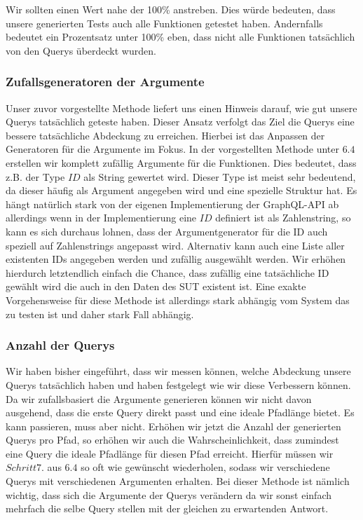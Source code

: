 Wir sollten einen Wert nahe der 100\% anstreben.
Dies würde bedeuten, dass unsere generierten Tests auch alle Funktionen getestet haben.
Andernfalls bedeutet ein Prozentsatz unter 100\% eben, dass nicht alle Funktionen tatsächlich von den Querys überdeckt wurden.


\subsubsection{Zufallsgeneratoren der Argumente}

Unser zuvor vorgestellte Methode liefert uns einen Hinweis darauf, wie gut unsere Querys tatsächlich geteste haben.
Dieser Ansatz verfolgt das Ziel die Querys eine bessere tatsächliche Abdeckung zu erreichen.
Hierbei ist das Anpassen der Generatoren für die Argumente im Fokus.
In der vorgestellten Methode unter $6.4$ erstellen wir komplett zufällig Argumente für die Funktionen.
Dies bedeutet, dass z.B. der Type $ID$ als String gewertet wird.
Dieser Type ist meist sehr bedeutend, da dieser häufig als Argument angegeben wird und eine spezielle Struktur hat.
Es hängt natürlich stark von der eigenen Implementierung der GraphQL-API ab allerdings wenn in der Implementierung
eine $ID$ definiert ist als Zahlenstring, so kann es sich durchaus lohnen, dass der Argumentgenerator für die ID auch speziell
auf Zahlenstrings angepasst wird.
Alternativ kann auch eine Liste aller existenten IDs angegeben werden und zufällig ausgewählt werden.
Wir erhöhen hierdurch letztendlich einfach die Chance, dass zufällig eine tatsächliche ID gewählt wird die auch
in den Daten des SUT existent ist.
Eine exakte Vorgehensweise für diese Methode ist allerdings stark abhängig vom System das zu testen ist und daher stark Fall abhängig.

\subsubsection{Anzahl der Querys}

Wir haben bisher eingeführt, dass wir messen können, welche Abdeckung unsere Querys tatsächlich haben und haben festgelegt wie wir diese Verbessern können.
Da wir zufallsbasiert die Argumente generieren können wir nicht davon ausgehend, dass die erste Query direkt passt und eine ideale Pfadlänge bietet.
Es kann passieren, muss aber nicht.
Erhöhen wir jetzt die Anzahl der generierten Querys pro Pfad, so erhöhen wir auch die Wahrscheinlichkeit,
dass zumindest eine Query die ideale Pfadlänge für diesen Pfad erreicht.
Hierfür müssen wir $Schritt 7.$ aus $6.4$ so oft wie gewünscht wiederholen, sodass wir verschiedene Querys mit verschiedenen Argumenten erhalten.
Bei dieser Methode ist nämlich wichtig, dass sich die Argumente der Querys verändern da wir sonst einfach mehrfach die selbe Query stellen mit der
gleichen zu erwartenden Antwort.

